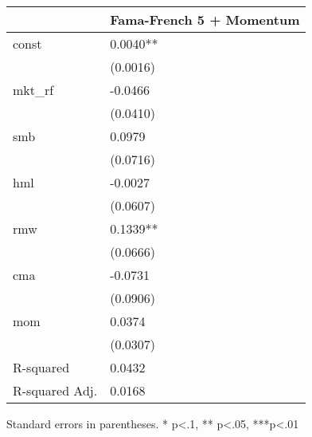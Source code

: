 \begin{table}
\caption{}
\label{}
\begin{center}
\begin{tabular}{ll}
\hline
               & Fama-French 5 + Momentum  \\
\hline
const          & 0.0040**                  \\
               & (0.0016)                  \\
mkt\_rf        & -0.0466                   \\
               & (0.0410)                  \\
smb            & 0.0979                    \\
               & (0.0716)                  \\
hml            & -0.0027                   \\
               & (0.0607)                  \\
rmw            & 0.1339**                  \\
               & (0.0666)                  \\
cma            & -0.0731                   \\
               & (0.0906)                  \\
mom            & 0.0374                    \\
               & (0.0307)                  \\
R-squared      & 0.0432                    \\
R-squared Adj. & 0.0168                    \\
\hline
\end{tabular}
\end{center}
\end{table}
\bigskip
Standard errors in parentheses. \newline 
* p<.1, ** p<.05, ***p<.01